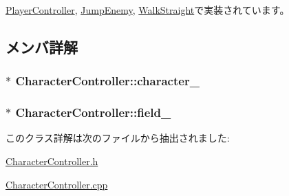 \hyperlink{class_player_controller_a3331f219d6f6a735c1e6cda5e8abb298}{Player\+Controller}, \hyperlink{class_jump_enemy_abd7019f8b333e710c1bb65b1b599182c}{Jump\+Enemy}, \hyperlink{class_walk_straight_ad8a6f6a0947df875c253752f72e9af0f}{Walk\+Straight}で実装されています。



\subsection{メンバ詳解}
\hypertarget{class_character_controller_a41167a323fafc09685765780911eab13}{
\subsubsection[{character\+\_\+}]{$\ast$ Character\+Controller\+::character\+\_\+\hspace{0.3cm}{\ttfamily [protected]}}}\label{class_character_controller_a41167a323fafc09685765780911eab13}
\hypertarget{class_character_controller_aee517c96b5c50a91aa1b0f16b8defd01}{
\subsubsection[{field\+\_\+}]{$\ast$ Character\+Controller\+::field\+\_\+\hspace{0.3cm}{\ttfamily [protected]}}}\label{class_character_controller_aee517c96b5c50a91aa1b0f16b8defd01}


このクラス詳解は次のファイルから抽出されました\+:\begin{DoxyCompactItemize}
\item 
\hyperlink{_character_controller_8h}{Character\+Controller.\+h}\item 
\hyperlink{_character_controller_8cpp}{Character\+Controller.\+cpp}\end{DoxyCompactItemize}

